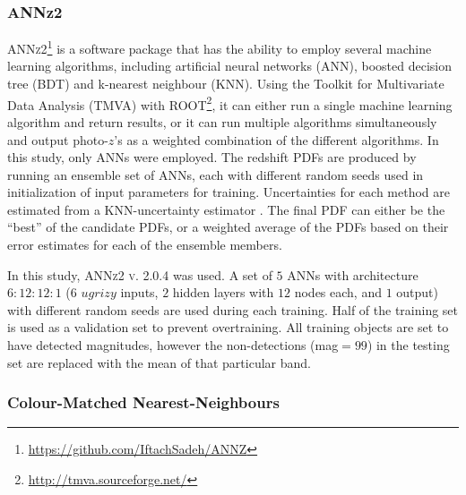\subsubsection{ANNz2}
\label{sec:annz2}

\textsc{ANNz2}\footnote{\url{https://github.com/IftachSadeh/ANNZ}} \citep{Sadeh:16} is a software package that has the ability to employ several machine learning algorithms, including artificial neural networks (ANN), boosted decision tree (BDT) and k-nearest neighbour (KNN). Using the Toolkit for Multivariate Data Analysis (TMVA) with ROOT\footnote{\url{http://tmva.sourceforge.net/}}, it can either run a single machine learning algorithm and return results, or it can run multiple algorithms simultaneously and output photo-$z$'s as a weighted combination of the different algorithms.  In this study, only ANNs were employed.  The redshift PDFs are produced by running an ensemble set of ANNs, each with different random seeds used in initialization of input parameters for training.  Uncertainties for each method are estimated from a KNN-uncertainty estimator \citep{Oyaizu:08}.  The final PDF can either be the ``best'' of the candidate PDFs, or a weighted average of the PDFs based on their error estimates for each of the ensemble members.

In this study, \textsc{ANNz2 v. 2.0.4} was used. A set of $5$ ANNs with architecture $6:12:12:1$ ($6$ $ugrizy$ inputs, $2$ hidden layers with $12$ nodes each, and $1$ output) with different random seeds are used during each training. %
Half of the training set is used as a validation set to prevent overtraining. All training objects are set to have detected magnitudes, however the non-detections (mag$=99$) in the testing set are replaced with the mean of that particular band.


\subsubsection{Colour-Matched Nearest-Neighbours}
\label{sec:cmnn}


